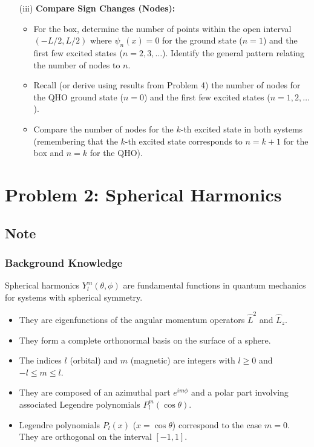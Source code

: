 \documentclass[10pt]{article}
\begin{document}
\begin{enumerate}
    \item[(iii)] \textbf{Compare Sign Changes (Nodes):}
        \begin{itemize}
            \item For the box, determine the number of points within the open interval \((-L/2, L/2)\) where \(\psi_n(x) = 0\) for the ground state (\(n=1\)) and the first few excited states (\(n=2, 3, \dots\)). Identify the general pattern relating the number of nodes to \(n\).
            \item Recall (or derive using results from Problem 4) the number of nodes for the QHO ground state (\(n=0\)) and the first few excited states (\(n=1, 2, \dots\)).
            \item Compare the number of nodes for the \(k\)-th excited state in both systems (remembering that the \(k\)-th excited state corresponds to \(n=k+1\) for the box and \(n=k\) for the QHO).
        \end{itemize}
\end{enumerate}

\section*{Problem 2: Spherical Harmonics}

\subsection*{Note}

\subsubsection*{Background Knowledge}
Spherical harmonics \(Y_l^m(\theta, \phi)\) are fundamental functions in quantum mechanics for systems with spherical symmetry.
\begin{itemize}
    \item They are eigenfunctions of the angular momentum operators \(\hat{L}^2\) and \(\hat{L}_z\).
    \item They form a complete orthonormal basis on the surface of a sphere.
    \item The indices \(l\) (orbital) and \(m\) (magnetic) are integers with \(l \ge 0\) and \(-l \le m \le l\).
    \item They are composed of an azimuthal part \(e^{im\phi}\) and a polar part involving associated Legendre polynomials \(P_l^m(\cos\theta)\).
    \item Legendre polynomials \(P_l(x)\) (\(x = \cos\theta\)) correspond to the case \(m=0\). They are orthogonal on the interval \([-1, 1]\).
\end{itemize}
\end{document}

